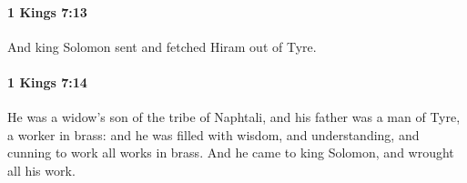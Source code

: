 		\paragraph{1 Kings 7:13} %
			\label{1KINGS-7-13}

			And king Solomon sent and fetched Hiram out of Tyre.


		\paragraph{1 Kings 7:14} %
			\label{1KINGS-7-14}

			He was a widow’s son of the tribe of Naphtali, and his father was a man of Tyre, a worker in brass: and he was filled with wisdom, and understanding, and cunning to work all works in brass. And he came to king Solomon, and wrought all his work.


